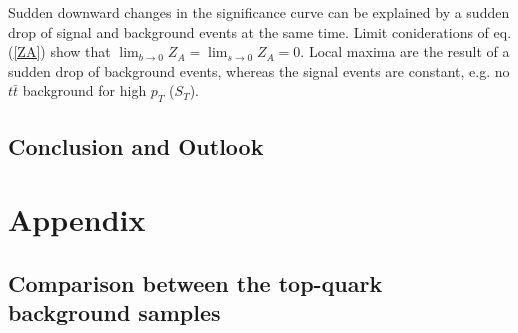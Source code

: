 %
Sudden downward changes in the significance curve can be explained by a sudden drop of signal and background events at the same time. Limit coniderations of eq. (\ref{ZA}) show that $\lim_{b\rightarrow 0}Z_A=\lim_{s\rightarrow 0}Z_A=0$. Local maxima are the result of a sudden drop of background events, whereas the signal events are constant, e.g. no $t\bar{t}$ background for high $p_T$ ($S_T$).  
\section{Conclusion and Outlook}
\appendix
\chapter{Appendix}
\section{Comparison between the top-quark background samples}\label{dilORnonallhad}
